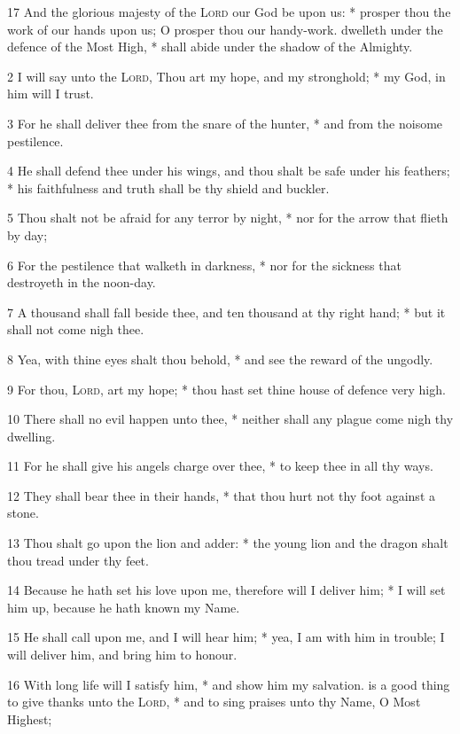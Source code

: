 17 And the glorious majesty of the {\textsc{Lord}} our God be upon us: * prosper thou the work of our hands upon us; O prosper thou our handy-work.
 dwelleth under the defence of the Most High, * shall abide under the shadow of the Almighty.\par
2 I will say unto the {\textsc{Lord}}, Thou art my hope, and my stronghold; * my God, in him will I trust.\par
3 For he shall deliver thee from the snare of the hunter, * and from the noisome pestilence.\par
4 He shall defend thee under his wings, and thou shalt be safe under his feathers; * his faithfulness and truth shall be thy shield and buckler.\par
5 Thou shalt not be afraid for any terror by night, * nor for the arrow that flieth by day;\par
6 For the pestilence that walketh in darkness, * nor for the sickness that destroyeth in the noon-day.\par
7 A thousand shall fall beside thee, and ten thousand at thy right hand; * but it shall not come nigh thee.\par
8 Yea, with thine eyes shalt thou behold, * and see the reward of the ungodly.\par
9 For thou, {\textsc{Lord}}, art my hope; * thou hast set thine house of defence very high.\par
10 There shall no evil happen unto thee, * neither shall any plague come nigh thy dwelling.\par
11 For he shall give his angels charge over thee, * to keep thee in all thy ways.\par
12 They shall bear thee in their hands, * that thou hurt not thy foot against a stone.\par
13 Thou shalt go upon the lion and adder: * the young lion and the dragon shalt thou tread under thy feet.\par
14 Because he hath set his love upon me, therefore will I deliver him; * I will set him up, because he hath known my Name.\par
15 He shall call upon me, and I will hear him; * yea, I am with him in trouble; I will deliver him, and bring him to honour.\par
16 With long life will I satisfy him, * and show him my salvation.
 is a good thing to give thanks unto the {\textsc{Lord}}, * and to sing praises unto thy Name, O Most Highest;\par
